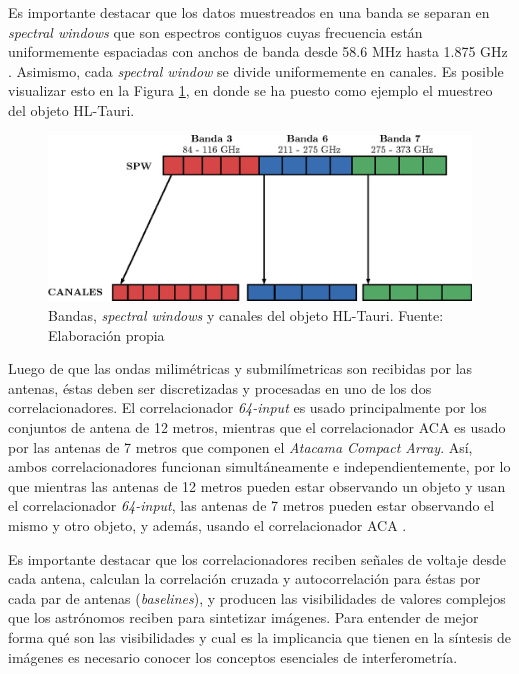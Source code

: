 Es importante destacar que los datos muestreados en una banda se separan en \textit{spectral windows} que son espectros contiguos cuyas frecuencia están uniformemente espaciadas con anchos de banda desde 58.6 MHz hasta 1.875 GHz \citep{alma-handbook}. Asimismo, cada \textit{spectral window} se divide uniformemente en canales. Es posible visualizar esto en la Figura \ref{fig:division}, en donde se ha puesto como ejemplo el muestreo del objeto HL-Tauri.

\begin{figure}[h!]
	\centering
	\includegraphics[scale=0.8]{images/frecuencias.eps}
	\caption{Bandas, \textit{spectral windows} y canales del objeto HL-Tauri. Fuente: Elaboración propia}
	\label{fig:division}
\end{figure}




Luego de que las ondas milimétricas y submilímetricas son recibidas por las antenas, éstas deben ser discretizadas y procesadas en uno de los dos correlacionadores. El correlacionador \textit{64-input} es usado principalmente por los conjuntos de antena de 12 metros, mientras que el correlacionador ACA es usado por las antenas de 7 metros que componen el \textit{Atacama Compact Array}. Así, ambos correlacionadores funcionan simultáneamente e independientemente, por lo que mientras las antenas de 12 metros pueden estar observando un objeto y usan el correlacionador \textit{64-input}, las antenas de 7 metros pueden estar observando el mismo y otro objeto, y además, usando el correlacionador ACA \citep{alma-handbook}.

Es importante destacar que los correlacionadores reciben señales de voltaje desde cada antena, calculan la correlación cruzada y autocorrelación para éstas por cada par de antenas (\textit{baselines}), y producen las visibilidades de valores complejos que los astrónomos reciben para sintetizar imágenes. Para entender de mejor forma qué son las visibilidades y cual es la implicancia que tienen en la síntesis de imágenes es necesario conocer los conceptos esenciales de interferometría.

